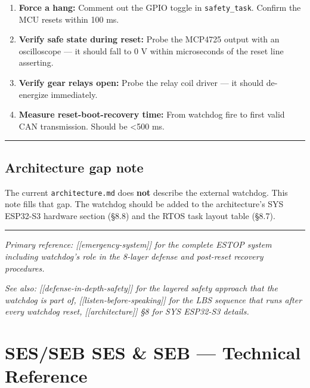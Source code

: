 \documentclass[12pt,a4paper,oneside]{report}
\providecommand{\tightlist}{\setlength{\itemsep}{0pt}\setlength{\parskip}{0pt}}
\begin{document}
\begin{enumerate}
\def\labelenumi{\arabic{enumi}.}
\tightlist
\item
  \textbf{Force a hang:} Comment out the GPIO toggle in \texttt{safety\_task}.
  Confirm the MCU resets within 100 ms.
\item
  \textbf{Verify safe state during reset:} Probe the MCP4725 output with an
  oscilloscope --- it should fall to 0 V within microseconds of the reset line
  asserting.
\item
  \textbf{Verify gear relays open:} Probe the relay coil driver --- it should
  de-energize immediately.
\item
  \textbf{Measure reset-boot-recovery time:} From watchdog fire to first valid
  CAN transmission. Should be \textless500 ms.
\end{enumerate}

\begin{center}\rule{0.5\linewidth}{0.5pt}\end{center}

\section{Architecture gap note}\label{architecture-gap-note}

The current \texttt{architecture.md} does \textbf{not} describe the external
watchdog. This note fills that gap. The watchdog should be added to the
architecture's SYS ESP32-S3 hardware section (§8.8) and the RTOS task layout
table (§8.7).

\begin{center}\rule{0.5\linewidth}{0.5pt}\end{center}

\emph{Primary reference: {[}{[}emergency-system{]}{]} for the complete ESTOP
system including watchdog's role in the 8-layer defense and post-reset recovery
procedures.}

\emph{See also: {[}{[}defense-in-depth-safety{]}{]} for the layered safety
approach that the watchdog is part of, {[}{[}listen-before-speaking{]}{]} for
the LBS sequence that runs after every watchdog reset, {[}{[}architecture{]}{]}
§8 for SYS ESP32-S3 details.}


\chapter{SES/SEB SES \& SEB --- Technical
Reference}\label{SES/SEB-SES-seb-technical-reference}
\end{document}
